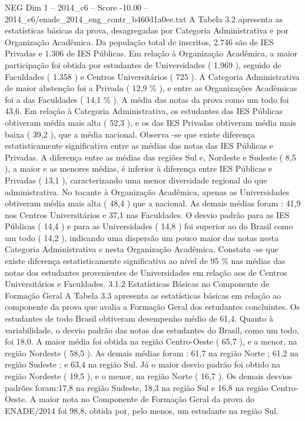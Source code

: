 \begin{textsample}{NEG Dim 1 – 2014\_c6 – Score -10.00 – 2014\_c6/enade\_2014\_eng\_contr\_b460d1a0ee.txt}
A Tabela 3.2 apresenta as estatísticas básicas da prova, desagregadas por Categoria Administrativa e por Organização Acadêmica.
Da população total de inscritos, 2.746 são de IES Privadas e 1.306 de IES Públicas.
Em relação à Organização Acadêmica, a maior participação foi obtida por estudantes de Universidades ( 1.969 ), seguido de Faculdades ( 1.358 ) e Centros Universitários ( 725 ).
A Categoria Administrativa de maior abstenção foi a Privada ( 12,9 \% ), e entre as Organizações Acadêmicas foi a das Faculdades ( 14,1 \% ).
A média das notas da prova como um todo foi 43,6.
Em relação à Categoria Administrativa, os estudantes das IES Públicas obtiveram média mais alta ( 52,3 ), e os das IES Privadas obtiveram média mais baixa ( 39,2 ), que a média nacional.
Observa -se que existe diferença estatisticamente significativa entre as médias das notas das IES Públicas e Privadas.
A diferença entre as médias das regiões Sul e, Nordeste e Sudeste ( 8,5 ), a maior e as menores médias, é inferior à diferença entre IES Públicas e Privadas ( 13,1 ), caracterizando uma menor diversidade regional do que administrativa.
No tocante à Organização Acadêmica, apenas as Universidades obtiveram média mais alta ( 48,4 ) que a nacional.
As demais médias foram : 41,9 nos Centros Universitários e 37,1 nas Faculdades.
O desvio padrão para as IES Públicas ( 14,4 ) e para as Universidades ( 14,8 ) foi superior ao do Brasil como um todo ( 14,2 ), indicando uma dispersão um pouco maior das notas nesta Categoria Administrativa e nesta Organização Acadêmica.
Constata -se que existe diferença estatisticamente significativa ao nível de 95 \% nas médias das notas dos estudantes provenientes de Universidades em relação aos de Centros Universitários e Faculdades. 3.1.2 Estatísticas Básicas no Componente de Formação Geral A Tabela 3.3 apresenta as estatísticas básicas em relação ao componente da prova que avalia a Formação Geral dos estudantes concluintes.
Os estudantes de todo Brasil obtiveram desempenho médio de 61,4.
Quanto à variabilidade, o desvio padrão das notas dos estudantes do Brasil, como um todo, foi 18,0.
A maior média foi obtida na região Centro-Oeste ( 65,7 ), e a menor, na região Nordeste ( 58,5 ).
As demais médias foram : 61,7 na região Norte ; 61,2 na região Sudeste ; e 63,4 na região Sul.
Já o maior desvio padrão foi obtido na região Nordeste ( 19,5 ), e o menor, na região Norte ( 16,7 ).
Os demais desvios padrões foram:17,8 na região Sudeste, 18,3 na região Sul e 16,8 na região Centro-Oeste.
A maior nota no Componente de Formação Geral da prova do ENADE/2014 foi 98,8, obtida por, pelo menos, um estudante na região Sul.

\end{textsample}
